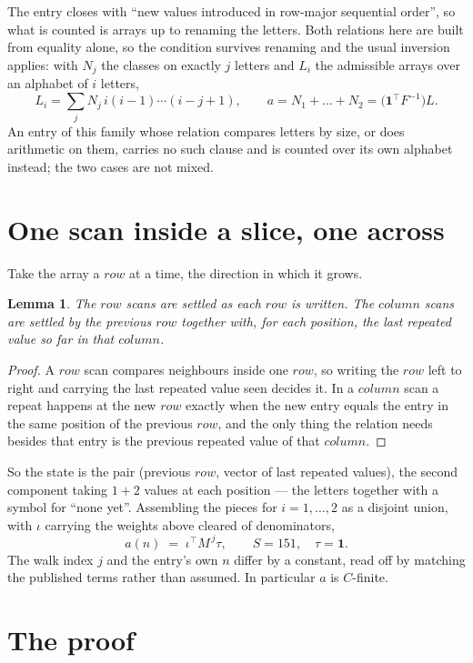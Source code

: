 \documentclass[11pt,a4paper]{article}
\theoremstyle{plain}
\newtheorem{lemma}[theorem]{Lemma}
\theoremstyle{definition}
\begin{document}
The entry closes with ``new values introduced in row-major sequential order'', so what is
counted is arrays up to renaming the letters. Both relations here are built from equality
alone, so the condition survives renaming and the usual inversion applies: with $N_j$ the
classes on exactly $j$ letters and $L_i$ the admissible arrays over an alphabet of $i$ letters,
\[
L_i=\sum_j N_j\,i(i-1)\cdots(i-j+1),\qquad
a=N_1+\dots+N_{2}=\bigl(\mathbf{1}^{\!\top}F^{-1}\bigr)L .
\]
An entry of this family whose relation compares letters by size, or does arithmetic on them,
carries no such clause and is counted over its own alphabet instead; the two cases are not
mixed.

\section{One scan inside a slice, one across}

Take the array a $row$ at a time, the direction in which it grows.

\begin{lemma}\label{lem:state}
The $row$ scans are settled as each $row$ is written. The $column$ scans are
settled by the previous $row$ together with, for each position, the last repeated value
so far in that $column$.
\end{lemma}

\begin{proof}
A $row$ scan compares neighbours inside one $row$, so writing the
$row$ left to right and carrying the last repeated value seen decides it. In a
$column$ scan a repeat happens at the new $row$ exactly when the new entry equals the
entry in the same position of the previous $row$, and the only thing the relation needs
besides that entry is the previous repeated value of that $column$.
\end{proof}

So the state is the pair (previous $row$, vector of last repeated values), the second
component taking $1+2$ values at each position --- the letters together with a symbol for
``none yet''. Assembling the pieces for $i=1,\dots,2$ as a disjoint union, with $\iota$ carrying the weights above cleared of denominators,
\[
a(n)\;=\;\iota^{\!\top}M^{\,j}\tau ,\qquad S=151,\quad\tau=\mathbf{1} .
\]
The walk index $j$ and the entry's own $n$ differ by a constant, read off by matching the
published terms rather than assumed. In particular $a$ is $C$-finite.

\section{The proof}
\end{document}
